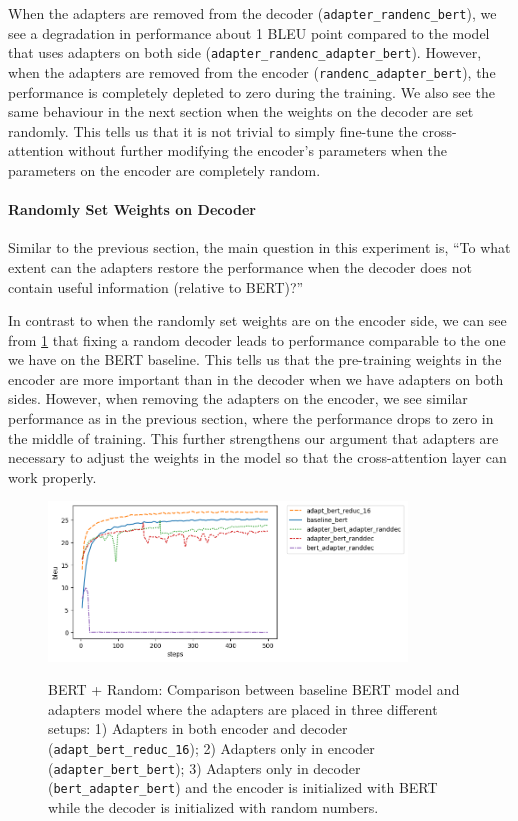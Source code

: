 When the adapters are removed from the decoder (\texttt{adapter\_randenc\_bert}), we see a degradation in performance about 1 BLEU point compared to the model that uses adapters on both side (\texttt{adapter\_randenc\_adapter\_bert}). However, when the adapters are removed from the encoder (\texttt{randenc\_adapter\_bert}), the performance is completely depleted to zero during the training. We also see the same behaviour in the next section when the weights on the decoder are set randomly. This tells us that it is not trivial to simply fine-tune the cross-attention without further modifying the encoder's parameters when the parameters on the encoder are completely random.

\paragraph{Randomly Set Weights on Decoder}
Similar to the previous section, the main question in this experiment is, ``To what extent can the adapters restore the performance when the decoder does not contain useful information (relative to BERT)?''

In contrast to when the randomly set weights are on the encoder side, we can see from \cref{img:adapt_bert_randdec} that fixing a random decoder leads to performance comparable to the one we have on the BERT baseline. This tells us that the pre-training weights in the encoder are more important than in the decoder when we have adapters on both sides. However, when removing the adapters on the encoder, we see similar performance as in the previous section, where the performance drops to zero in the middle of training. This further strengthens our argument that adapters are necessary to adjust the weights in the model so that the cross-attention layer can work properly.

\begin{figure}[h]
    {\includegraphics[width=0.85\textwidth]{img/adapter_bert_randdec.png}}
    \centering
    \caption[BERT + Random: Comparison for model with adapters in the decoder and the decoder is initalized with random weights]{BERT + Random: Comparison between baseline BERT model and adapters model where the adapters are placed in three different setups: 1) Adapters in both encoder and decoder (\texttt{adapt\_bert\_reduc\_16}); 2) Adapters only in encoder (\texttt{adapter\_bert\_bert}); 3) Adapters only in decoder (\texttt{bert\_adapter\_bert}) and the encoder is initialized with BERT while the decoder is initialized with random numbers.}
    \label{img:adapt_bert_randdec}
\end{figure}

